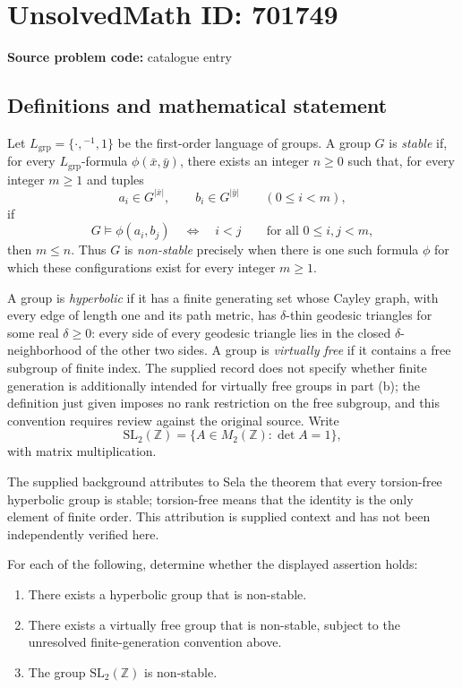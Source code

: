 \documentclass[11pt]{article}
\newcommand{\Z}{\mathbb{Z}}
\begin{document}
\section*{UnsolvedMath ID: 701749}
\textbf{Source problem code:} catalogue entry
\subsection{Definitions and mathematical statement}
Let \(L_{\mathrm{grp}}=\{\cdot,{}^{-1},1\}\) be the first-order language of groups. A group \(G\) is \emph{stable} if, for every \(L_{\mathrm{grp}}\)-formula \(\phi(\bar x,\bar y)\), there exists an integer \(n\geq 0\) such that, for every integer \(m\geq 1\) and tuples
\[
 a_i\in G^{|\bar x|},\qquad b_i\in G^{|\bar y|}\qquad(0\leq i<m),
\]
if
\[
 G\models\phi(a_i,b_j)\quad\Longleftrightarrow\quad i<j
 \qquad\text{for all }0\leq i,j<m,
\]
then \(m\leq n\). Thus \(G\) is \emph{non-stable} precisely when there is one such formula \(\phi\) for which these configurations exist for every integer \(m\geq 1\).

A group is \emph{hyperbolic} if it has a finite generating set whose Cayley graph, with every edge of length one and its path metric, has \(\delta\)-thin geodesic triangles for some real \(\delta\geq 0\): every side of every geodesic triangle lies in the closed \(\delta\)-neighborhood of the other two sides. A group is \emph{virtually free} if it contains a free subgroup of finite index. The supplied record does not specify whether finite generation is additionally intended for virtually free groups in part (b); the definition just given imposes no rank restriction on the free subgroup, and this convention requires review against the original source. Write
\[
 \mathrm{SL}_2(\Z)=\{A\in M_2(\Z):\det A=1\},
\]
with matrix multiplication.

The supplied background attributes to Sela the theorem that every torsion-free hyperbolic group is stable; torsion-free means that the identity is the only element of finite order. This attribution is supplied context and has not been independently verified here.

For each of the following, determine whether the displayed assertion holds:
\begin{enumerate}
\item[(a)] There exists a hyperbolic group that is non-stable.
\item[(b)] There exists a virtually free group that is non-stable, subject to the unresolved finite-generation convention above.
\item[(c)] The group \(\mathrm{SL}_2(\Z)\) is non-stable.
\end{enumerate}
\end{document}
